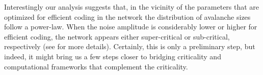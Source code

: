 Interestingly our analysis suggests that,
in the vicinity of the parameters that are optimized for efficient coding in the network %
the distribution of avalanche sizes follow a power-law. 
When the noise amplitude is considerably lower or higher for efficient coding,
the network appears either super-critical or sub-critical, respectively
(see  for more details). 
Certainly, this is only a preliminary step, but indeed, 
it might bring us a few  steps closer to bridging criticality and computational frameworks that complement the criticality.


